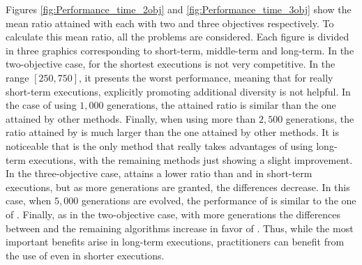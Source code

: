 Figures \ref{fig:Performance_time_2obj} and \ref{fig:Performance_time_3obj} show the mean \HV{} ratio attained with each \MOEA{} with two and three objectives respectively.
%
To calculate this mean ratio, all the problems are considered.
%
Each figure is divided in three graphics corresponding to short-term, middle-term and long-term.
%
In the two-objective case, for the shortest executions \VSDMOEA{} is not very competitive.
%
In the range $[250, 750]$, it presents the worst performance, meaning that for really short-term executions,
explicitly promoting additional diversity is not helpful.
%
In the case of using $1,000$ generations, the attained \HV{} ratio is similar than the one attained by other methods.
%
Finally, when using more than $2,500$ generations, the \HV{} ratio attained by \VSDMOEA{} is much larger than the one
attained by other methods.
%
It is noticeable that \VSDMOEA{} is the only method that really takes advantages of using long-term executions,
with the remaining methods just showing a slight improvement.
%
In the three-objective case, \VSDMOEA{} attains a lower \HV{} ratio than \RMOEA{} and \MOEAD{} in short-term executions,
but as more generations are granted, the differences decrease.
%
In this case, when $5,000$ generations are evolved, the performance of \VSDMOEA{} is similar to the one of \RMOEA{}.
%
Finally, as in the two-objective case, with more generations the differences between \VSDMOEA{} and the remaining
algorithms increase in favor of \VSDMOEA{}.
%
Thus, while the most important benefits arise in long-term executions, practitioners can benefit from the use
of \VSDMOEA{} even in shorter executions.



